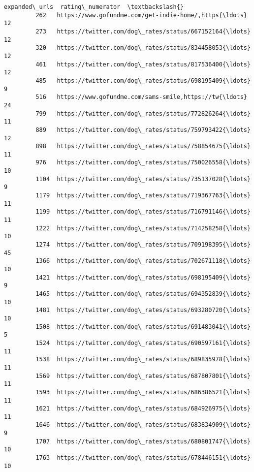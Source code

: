 \documentclass[11pt]{article}
\begin{document}
\begin{Verbatim}[commandchars=\\\{\}]
                                                   expanded\_urls  rating\_numerator  \textbackslash{}
         262   https://www.gofundme.com/get-indie-home/,https{\ldots}                12   
         273   https://twitter.com/dog\_rates/status/667152164{\ldots}                12   
         320   https://twitter.com/dog\_rates/status/834458053{\ldots}                12   
         461   https://twitter.com/dog\_rates/status/817536400{\ldots}                12   
         485   https://twitter.com/dog\_rates/status/698195409{\ldots}                 9   
         516   https://www.gofundme.com/sams-smile,https://tw{\ldots}                24   
         799   https://twitter.com/dog\_rates/status/772826264{\ldots}                11   
         889   https://twitter.com/dog\_rates/status/759793422{\ldots}                12   
         898   https://twitter.com/dog\_rates/status/758854675{\ldots}                11   
         976   https://twitter.com/dog\_rates/status/750026558{\ldots}                10   
         1104  https://twitter.com/dog\_rates/status/735137028{\ldots}                 9   
         1179  https://twitter.com/dog\_rates/status/719367763{\ldots}                11   
         1199  https://twitter.com/dog\_rates/status/716791146{\ldots}                11   
         1222  https://twitter.com/dog\_rates/status/714258258{\ldots}                10   
         1274  https://twitter.com/dog\_rates/status/709198395{\ldots}                45   
         1366  https://twitter.com/dog\_rates/status/702671118{\ldots}                10   
         1421  https://twitter.com/dog\_rates/status/698195409{\ldots}                 9   
         1465  https://twitter.com/dog\_rates/status/694352839{\ldots}                10   
         1481  https://twitter.com/dog\_rates/status/693280720{\ldots}                10   
         1508  https://twitter.com/dog\_rates/status/691483041{\ldots}                 5   
         1524  https://twitter.com/dog\_rates/status/690597161{\ldots}                11   
         1538  https://twitter.com/dog\_rates/status/689835978{\ldots}                11   
         1569  https://twitter.com/dog\_rates/status/687807801{\ldots}                11   
         1593  https://twitter.com/dog\_rates/status/686386521{\ldots}                11   
         1621  https://twitter.com/dog\_rates/status/684926975{\ldots}                11   
         1646  https://twitter.com/dog\_rates/status/683834909{\ldots}                 9   
         1707  https://twitter.com/dog\_rates/status/680801747{\ldots}                10   
         1763  https://twitter.com/dog\_rates/status/678446151{\ldots}                10   

\end{Verbatim}
\end{document}
